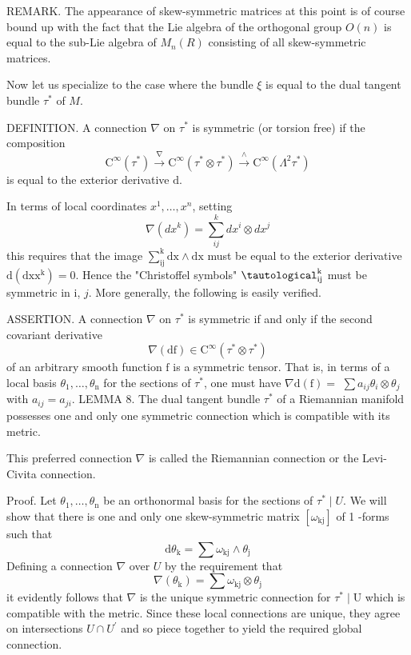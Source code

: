 \documentclass[10pt]{article}
\begin{document}
REMARK. The appearance of skew-symmetric matrices at this point is of course bound up with the fact that the Lie algebra of the orthogonal group $O(n)$ is equal to the sub-Lie algebra of $M_{n}(R)$ consisting of all skew-symmetric matrices.

Now let us specialize to the case where the bundle $\xi$ is equal to the dual tangent bundle $\tau^{*}$ of $M$.

DEFINITION. A connection $\nabla$ on $\tau^{*}$ is symmetric (or torsion free) if the composition
$$
\mathrm{C}^{\infty}\left(\tau^{*}\right) \stackrel{\nabla}{\longrightarrow} \mathrm{C}^{\infty}\left(\tau^{*} \otimes \tau^{*}\right) \stackrel{\wedge}{\longrightarrow} \mathrm{C}^{\infty}\left(\Lambda^{2} \tau^{*}\right)
$$
is equal to the exterior derivative $\mathrm{d}$.

In terms of local coordinates $x^{1}, \ldots, x^{n}$, setting
$$
\nabla\left(d x^{k}\right)=\sum_{i j}^{k} d x^{i} \otimes d x^{j}
$$
this requires that the image $\sum_{\mathrm{ij}}^{\mathrm{k}} \mathrm{dx} \wedge \mathrm{dx}$ must be equal to the exterior derivative $\mathrm{d}\left(\mathrm{dx} \mathrm{x}^{\mathrm{k}}\right)=0$. Hence the "Christoffel symbols" $\tautological_{\mathrm{ij}}^{\mathrm{k}}$ must be symmetric in i, $j$. More generally, the following is easily verified.

ASSERTION. A connection $\nabla$ on $\tau^{*}$ is symmetric if and only if the second covariant derivative
$$
\nabla(\mathrm{df}) \in \mathrm{C}^{\infty}\left(\tau^{*} \otimes \tau^{*}\right)
$$
of an arbitrary smooth function $\mathrm{f}$ is a symmetric tensor. That is, in terms of a local basis $\theta_{1}, \ldots, \theta_{\mathrm{n}}$ for the sections of $\tau^{*}$, one must have $\nabla \mathrm{d}(\mathrm{f})=$ $\sum a_{i j} \theta_{i} \otimes \theta_{j}$ with $a_{i j}=a_{j i}$. LEMMA 8. The dual tangent bundle $\tau^{*}$ of a Riemannian manifold possesses one and only one symmetric connection which is compatible with its metric.

This preferred connection $\nabla$ is called the Riemannian connection or the Levi-Civita connection.

Proof. Let $\theta_{1}, \ldots, \theta_{\mathrm{n}}$ be an orthonormal basis for the sections of $\tau^{*} \mid U$. We will show that there is one and only one skew-symmetric matrix $\left[\omega_{\mathrm{kj}}\right]$ of 1 -forms such that
$$
\mathrm{d} \theta_{\mathrm{k}}=\sum \omega_{\mathrm{kj}} \wedge \theta_{\mathrm{j}}
$$
Defining a connection $\nabla$ over $U$ by the requirement that
$$
\nabla\left(\theta_{\mathrm{k}}\right)=\sum \omega_{\mathrm{kj}} \otimes \theta_{\mathrm{j}}
$$
it evidently follows that $\nabla$ is the unique symmetric connection for $\tau^{*} \mid \mathrm{U}$ which is compatible with the metric. Since these local connections are unique, they agree on intersections $U \cap U^{\prime}$ and so piece together to yield the required global connection.
\end{document}
